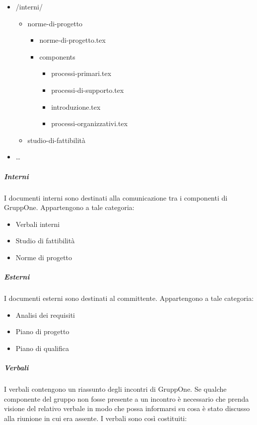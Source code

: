 \documentclass[../norme-di-progetto.tex]{subfiles}
\begin{document}
\begin{itemize}
  \item[] /interni/
  \begin{itemize}
  \item norme-di-progetto
     \begin{itemize}
       \item norme-di-progetto.tex
       \item components
       \begin{itemize}
         \item processi-primari.tex
         \item processi-di-supporto.tex
         \item introduzione.tex
         \item processi-organizzativi.tex
       \end{itemize}
     \end{itemize}
  \item studio-di-fattibilità
  \end{itemize}
  \item[] \ldots
\end{itemize}

\subparagraph{Interni}%
\label{subp:suddivisione_dei_documenti/interni}
I documenti interni sono destinati alla comunicazione tra i componenti di GruppOne. Appartengono a tale categoria:

\begin{itemize}
  \item Verbali interni
  \item Studio di fattibilità
  \item Norme di progetto
\end{itemize}

\subparagraph{Esterni}%
\label{subp:suddivisione_dei_documenti/esterni}
I documenti esterni sono destinati al committente. Appartengono a tale categoria:

\begin{itemize}
  \item Analisi dei requisiti
  \item Piano di progetto
  \item Piano di qualifica
\end{itemize}

\subparagraph{Verbali}%
\label{subp:verbali}
I verbali contengono un riassunto degli incontri di GruppOne.
Se qualche componente del gruppo non fosse presente a un incontro è necessario che prenda visione del relativo verbale in modo che possa informarsi su cosa è stato discusso alla riunione in cui era assente.
I verbali sono così costituiti:
\end{document}
